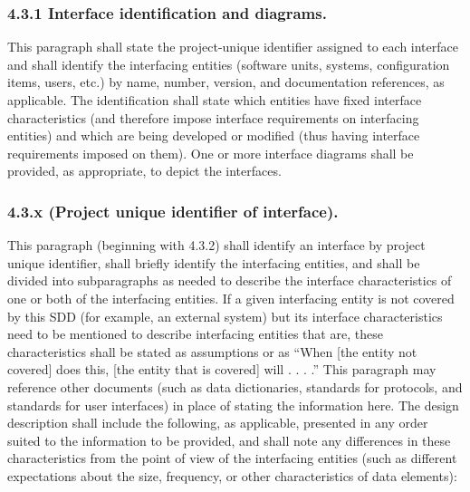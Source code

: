 \subsubsection{4.3.1 Interface identification and diagrams.}

This paragraph shall state the project-unique identifier assigned to
each interface and shall identify the interfacing entities (software
units, systems, configuration items, users, etc.) by name, number,
version, and documentation references, as applicable. The identification
shall state which entities have fixed interface characteristics (and
therefore impose interface requirements on interfacing entities) and
which are being developed or modified (thus having interface
requirements imposed on them). One or more interface diagrams shall be
provided, as appropriate, to depict the interfaces.

\subsubsection{4.3.x (Project unique identifier of interface).}

This paragraph (beginning with 4.3.2) shall identify an interface by
project unique identifier, shall briefly identify the interfacing
entities, and shall be divided into subparagraphs as needed to describe
the interface characteristics of one or both of the interfacing
entities. If a given interfacing entity is not covered by this SDD (for
example, an external system) but its interface characteristics need to
be mentioned to describe interfacing entities that are, these
characteristics shall be stated as assumptions or as ``When {[}the
entity not covered{]} does this, {[}the entity that is covered{]} will .
. . .'' This paragraph may reference other documents (such as data
dictionaries, standards for protocols, and standards for user
interfaces) in place of stating the information here. The design
description shall include the following, as applicable, presented in any
order suited to the information to be provided, and shall note any
differences in these characteristics from the point of view of the
interfacing entities (such as different expectations about the size,
frequency, or other characteristics of data elements):

